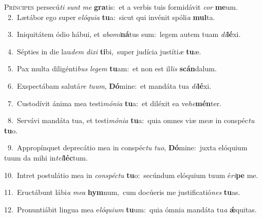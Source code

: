 \lettrine{\initial\textcolor{\initialcolor}{P}}{ríncipes} persecú\textit{ti} \textit{sunt} \textit{me} \textbf{gra}\-tis:~\star et a verbis tuis formidávit \textit{cor} \textbf{me}\-um.\\
{\numbfont\textcolor{\numbcolor}{~2.}}~Lætábor ego super e\-\textit{ló}\-\textit{qui}\textit{a} \textbf{tu}\-a:~\star sicut qui invénit spóli\textit{a} \textbf{mul}\-ta.\par
{\numbfont\textcolor{\numbcolor}{~3.}}~Iniquitátem ódio hábui, et \textit{ab}\-\textit{o}\textit{mi}\textbf{ná}tus sum:~\star legem autem tuam \textit{di}\-\textbf{lé}xi.\par
{\numbfont\textcolor{\numbcolor}{~4.}}~Sépties in die lau\textit{dem} \textit{di}\-\textit{xi} \textbf{ti}\-bi,~\star super judícia justíti\textit{æ} \textbf{tu}\-æ.\par
{\numbfont\textcolor{\numbcolor}{~5.}}~Pax multa diligénti\textit{bus} \textit{le}\-\textit{gem} \textbf{tu}\-am:~\star et non est il\textit{lis} \textbf{scán}\-dalum.\par
{\numbfont\textcolor{\numbcolor}{~6.}}~Exspectábam salutá\textit{re} \textit{tu}\-\textit{um}, \textbf{Dó}\-mine:~\star et mandáta tua \textit{di}\-\textbf{lé}xi.\par
{\numbfont\textcolor{\numbcolor}{~7.}}~Custodívit ánima mea testi\-\textit{mó}\-\textit{ni}\textit{a} \textbf{tu}\-a:~\star et diléxit ea ve\-\textit{he}\-\textbf{mén}ter.\par
{\numbfont\textcolor{\numbcolor}{~8.}}~Servávi mandáta tua, et testi\-\textit{mó}\-\textit{ni}\textit{a} \textbf{tu}\-a:~\star quia omnes viæ meæ in conspéc\textit{tu} \textbf{tu}\-o.\par
{\numbfont\textcolor{\numbcolor}{~9.}}~Appropínquet deprecátio mea in conspéc\textit{tu} \textit{tu}\-\textit{o}, \textbf{Dó}\-mine:~\star juxta elóquium tuum da mihi in\-\textit{tel}\-\textbf{léc}tum.\par
{\numbfont\textcolor{\numbcolor}{10.}}~Intret postulátio mea in \textit{con}\-\textit{spéc}\textit{tu} \textbf{tu}\-o:~\star secúndum elóquium tuum é\-\textit{ri}\-\textbf{pe} me.\par
{\numbfont\textcolor{\numbcolor}{11.}}~Eructábunt lábi\textit{a} \textit{me}\-\textit{a} \textbf{hym}\-num,~\star cum docúeris me justificatió\textit{nes} \textbf{tu}\-as.\par
{\numbfont\textcolor{\numbcolor}{12.}}~Pronuntiábit lingua mea e\-\textit{ló}\-\textit{qui}\textit{um} \textbf{tu}\-um:~\star quia ómnia mandáta tu\textit{a} \textbf{ǽ}\-quitas.\par
